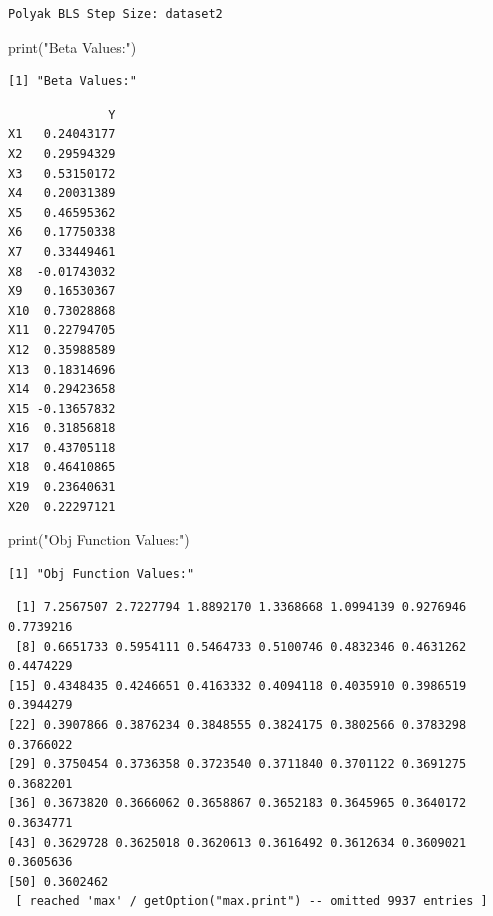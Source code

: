 \documentclass[
  letterpaper,
  DIV=11,
  numbers=noendperiod]{scrartcl}
\newenvironment{Shaded}{\begin{snugshade}}{\end{snugshade}}
\newcommand{\FunctionTok}[1]{\textcolor[rgb]{0.28,0.35,0.67}{#1}}
\newcommand{\NormalTok}[1]{\textcolor[rgb]{0.00,0.23,0.31}{#1}}
\newcommand{\SpecialCharTok}[1]{\textcolor[rgb]{0.37,0.37,0.37}{#1}}
\newcommand{\StringTok}[1]{\textcolor[rgb]{0.13,0.47,0.30}{#1}}
\begin{document}
\begin{verbatim}
Polyak BLS Step Size: dataset2 
\end{verbatim}

\begin{Shaded}
\begin{Highlighting}[]
\FunctionTok{print}\NormalTok{(}\StringTok{"Beta Values:"}\NormalTok{)}
\end{Highlighting}
\end{Shaded}

\begin{verbatim}
[1] "Beta Values:"
\end{verbatim}

\begin{Shaded}
\end{Shaded}

\begin{verbatim}
              Y
X1   0.24043177
X2   0.29594329
X3   0.53150172
X4   0.20031389
X5   0.46595362
X6   0.17750338
X7   0.33449461
X8  -0.01743032
X9   0.16530367
X10  0.73028868
X11  0.22794705
X12  0.35988589
X13  0.18314696
X14  0.29423658
X15 -0.13657832
X16  0.31856818
X17  0.43705118
X18  0.46410865
X19  0.23640631
X20  0.22297121
\end{verbatim}

\begin{Shaded}
\begin{Highlighting}[]
\FunctionTok{print}\NormalTok{(}\StringTok{"Obj Function Values:"}\NormalTok{)}
\end{Highlighting}
\end{Shaded}

\begin{verbatim}
[1] "Obj Function Values:"
\end{verbatim}

\begin{Shaded}
\end{Shaded}

\begin{verbatim}
 [1] 7.2567507 2.7227794 1.8892170 1.3368668 1.0994139 0.9276946 0.7739216
 [8] 0.6651733 0.5954111 0.5464733 0.5100746 0.4832346 0.4631262 0.4474229
[15] 0.4348435 0.4246651 0.4163332 0.4094118 0.4035910 0.3986519 0.3944279
[22] 0.3907866 0.3876234 0.3848555 0.3824175 0.3802566 0.3783298 0.3766022
[29] 0.3750454 0.3736358 0.3723540 0.3711840 0.3701122 0.3691275 0.3682201
[36] 0.3673820 0.3666062 0.3658867 0.3652183 0.3645965 0.3640172 0.3634771
[43] 0.3629728 0.3625018 0.3620613 0.3616492 0.3612634 0.3609021 0.3605636
[50] 0.3602462
 [ reached 'max' / getOption("max.print") -- omitted 9937 entries ]
\end{verbatim}
\end{document}
